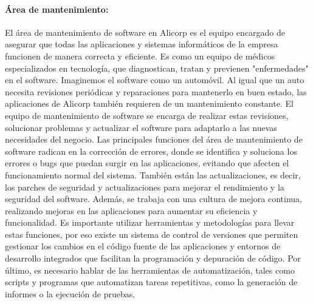         \paragraph{Área de mantenimiento: }
        El área de mantenimiento de software en Alicorp es el equipo encargado de asegurar que todas las aplicaciones y sistemas informáticos de la empresa funcionen de manera correcta y eficiente. Es como un equipo de médicos especializados en tecnología, que diagnostican, tratan y previenen "enfermedades" en el software. 
        Imaginemos el software como un automóvil. Al igual que un auto necesita revisiones periódicas y reparaciones para mantenerlo en buen estado, las aplicaciones de Alicorp también requieren de un mantenimiento constante. El equipo de mantenimiento de software se encarga de realizar estas revisiones, solucionar problemas y actualizar el software para adaptarlo a las nuevas necesidades del negocio. 
        Las principales funciones del área de mantenimiento de software radican en la corrección de errores, donde se identifica y soluciona los errores o bugs que puedan surgir en las aplicaciones, evitando que afecten el funcionamiento normal del sistema. También están las actualizaciones, es decir, los parches de seguridad y actualizaciones para mejorar el rendimiento y la seguridad del software. Además, se trabaja con una cultura de mejora continua, realizando mejoras en las aplicaciones para aumentar su eficiencia y funcionalidad. 
        Es importante utilizar herramientas y metodologías para llevar estas funciones, por eso existe un sistema de control de versiones que permiten gestionar los cambios en el código fuente de las aplicaciones y entornos de desarrollo integrados que facilitan la programación y depuración de código. Por último, es necesario hablar de las herramientas de automatización, tales como scripts y programas que automatizan tareas repetitivas, como la generación de informes o la ejecución de pruebas. 

